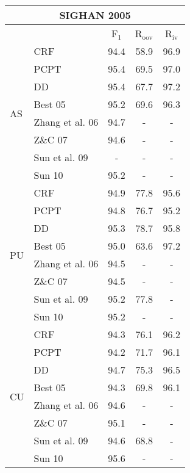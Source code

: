 \begin{table}
\centering
\begin{small}
\begin{tabular}{ l | l | c | c | c   }
\multicolumn{5}{c}{\large{SIGHAN 2005}} \\
\hline
    \multicolumn{2}{c}{}  & \multicolumn{1}{c}{F$_1$}   &   \multicolumn{1}{c|}{R$_{\mathrm{oov}}$}    &  \multicolumn{1}{c}{R$_{\mathrm{iv}}$}   \\ 
\hline
\multirow{8}{*}{AS} &  CRF       & 94.4  &  58.9 & 96.9 \\
 & PCPT                                       & 95.4  & 69.5 & 97.0 \\ 
& DD                                        & {95.4}  & {67.7} & {97.2} \\
\cline{2-5}
& Best 05      & 95.2 &   69.6 &  96.3 \\
& Zhang et al. 06      & 94.7 &   - & - \\
& Z\&C 07      & 94.6 &   - & - \\
& Sun et al. 09      & -  &  -  & - \\
& Sun 10      & 95.2  &   -  & - \\
\hline


\multirow{8}{*}{PU} &   CRF     & 94.9  &   77.8 &  95.6 \\
& PCPT & 94.8  &  76.7 &  95.2 \\
& DD  & {95.3}  &  {78.7} &95.8 \\
\cline{2-5}
& Best 05     &  95.0   &  63.6 &  {97.2} \\
& Zhang et al. 06      & 94.5 &   - & - \\
& Z\&C 07      & 94.5 &   - & - \\
& Sun et al. 09     & 95.2  &  77.8  & - \\
& Sun 10     & 95.2  &   -  & - \\
\hline

\multirow{8}{*}{CU}  & CRF   &  94.3  & {76.1} & 96.2 \\
& PCPT & 94.2  & 71.7  & 96.1  \\
& DD & {94.7}  & {75.3} & {96.5}  \\
\cline{2-5}
& Best 05     & 94.3  & 69.8 & 96.1 \\
& Zhang et al. 06      & 94.6 &   - & - \\
& Z\&C 07      & 95.1 &   - & - \\
& Sun et al. 09     & 94.6  &   68.8  & - \\
& Sun 10  & 95.6  &   -  & - \\
\hline



\end{tabular}
\end{small}
\end{table}

